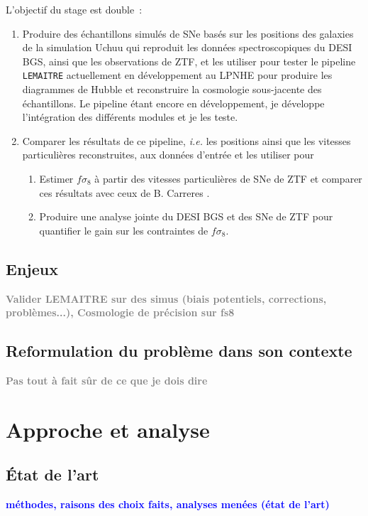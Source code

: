 \documentclass{book}
\newcommand{\todo}[1]{{\textcolor{gray}{\bf \large #1}}}
\newcommand{\consignes}[1]{{\textcolor{blue}{\bf \large #1}}}
\begin{document}
L'objectif du stage est double~:
\begin{enumerate}
    \item Produire des échantillons simulés de SNe basés sur les positions des galaxies de la simulation Uchuu qui reproduit les données spectroscopiques du DESI BGS, ainsi que les observations de ZTF, et les utiliser pour tester le pipeline \verb|LEMAITRE| actuellement en développement au LPNHE pour produire les diagrammes de Hubble et reconstruire la cosmologie sous-jacente des échantillons. Le pipeline étant encore en développement, je développe l'intégration des différents modules et je les teste.
    \item Comparer les résultats de ce pipeline, \textit{i.e.} les positions ainsi que les vitesses particulières reconstruites, aux données d'entrée et les utiliser pour
    	\begin{enumerate}
		\item Estimer $f \sigma_8$ à partir des vitesses particulières de SNe de ZTF et comparer ces résultats avec ceux de B. Carreres \cite{carreres_growth-rate_2023}.
		\item Produire une analyse jointe du DESI BGS et des SNe de ZTF pour quantifier le gain sur les contraintes de $f\sigma_8$.
	\end{enumerate}
\end{enumerate}

\section{Enjeux}

\todo{ Valider LEMAITRE sur des simus (biais potentiels, corrections, problèmes...), Cosmologie de précision sur fs8}

\section{Reformulation du problème dans son contexte}

\todo{Pas tout à fait sûr de ce que je dois dire}

\chapter{Approche et analyse}

\section{État de l'art}
\consignes{méthodes, raisons des choix faits, analyses menées (état de l’art)}
\end{document}
